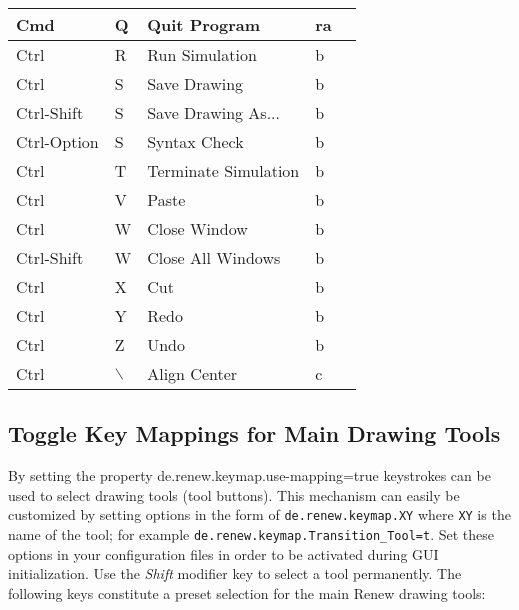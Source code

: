 \begin{longtable}{|l|l|l|l|l|}
Cmd          & Q   & Quit Program              & ra &                \\ \hline 
Ctrl         & R   & Run Simulation            & b  &                \\ \hline 
Ctrl         & S   & Save Drawing              & b  &                \\ \hline 
Ctrl-Shift   & S   & Save Drawing As...        & b  &                \\ \hline 
Ctrl-Option  & S   & Syntax Check              & b  &                \\ \hline 
Ctrl         & T   & Terminate Simulation      & b  &                \\ \hline 
Ctrl         & V   & Paste                     & b  &                \\ \hline 
Ctrl         & W   & Close Window              & b  &                \\ \hline 
Ctrl-Shift       & W   & Close All Windows     & b  &                \\ \hline
Ctrl         & X   & Cut                       & b  &                \\ \hline 
Ctrl         & Y   & Redo                      & b  &                \\ \hline 
Ctrl         & Z   & Undo                      & b  &                \\ \hline 
Ctrl         & $\backslash$   & Align Center   & c  &                \\ \hline 

\end{longtable}

\subsection*{Toggle Key Mappings for Main Drawing Tools}

By setting the property \textsf{de.renew.keymap.use-mapping=true}
keystrokes can be used to select drawing tools (tool buttons).
%
This mechanism can easily be customized by setting options in the form
of \texttt{de.renew.keymap.XY} where \texttt{XY} is the name of the
tool; for example \texttt{de.renew.keymap.Transition\_Tool=t}.
%
Set these options in your configuration files in order to be activated
during GUI initialization.
%
Use the \emph{Shift} modifier key to select a tool permanently.
%
The following keys constitute a preset selection for the main Renew
drawing tools:

